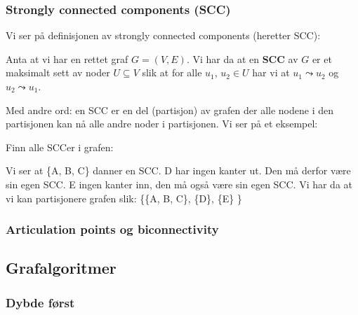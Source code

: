 \subsubsection{Strongly connected components (SCC)}
Vi ser på definisjonen av strongly connected components (heretter SCC):
\begin{definisjon}
Anta at vi har en rettet graf $ G = (V, E) $. Vi har da at en \textbf{SCC} av $ G $ er et maksimalt sett av noder $ U \subseteq V $ slik at for alle $ u_1 $, $ u_{2} \in U $ har vi at $ u_1 \leadsto u_2 $ og $ u_2 \leadsto u_1 $.
\end{definisjon}

Med andre ord: en SCC er en del (partisjon) av grafen der alle nodene i den partisjonen kan nå alle andre noder i partisjonen. Vi ser på et eksempel:

\begin{eks} Finn alle SCCer i grafen:
\begin{figure}[H]
\centering
{}
\end{figure}
Vi ser at \{A, B, C\} danner en SCC. D har ingen kanter ut. Den må derfor være sin egen SCC. E ingen kanter inn, den må også være sin egen SCC. Vi har da at vi kan partisjonere grafen slik: \{\{A, B, C\}, \{D\}, \{E\} \}
\end{eks}

\subsubsection{\color{red}Articulation points og biconnectivity}


\subsection{\color{red}Grafalgoritmer}

\subsubsection{\color{red}Dybde først}


